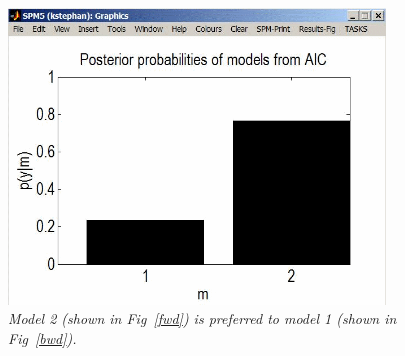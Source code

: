 \begin{figure}[ht]
\begin{center}
\includegraphics[width=100mm]{dcm/Fig8}
\caption{\em Model 2 (shown in Fig~\ref{fwd}) is preferred to model 1 (shown in Fig~\ref{bwd}).\label{fig8}}
\end{center}
\end{figure}
